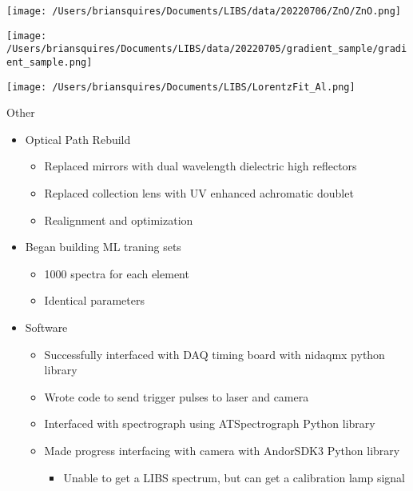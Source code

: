\documentclass{beamer}
\begin{document}
\begin{frame}
    \texttt{[image: /Users/briansquires/Documents/LIBS/data/20220706/ZnO/ZnO.png]}
\end{frame}

\begin{frame}
    \texttt{[image: /Users/briansquires/Documents/LIBS/data/20220705/gradient\_sample/gradient\_sample.png]}
\end{frame}

\begin{frame}
    \texttt{[image: /Users/briansquires/Documents/LIBS/LorentzFit\_Al.png]}
\end{frame}

\begin{frame}{Other}
    \begin{itemize}
        \item Optical Path Rebuild
        \begin{itemize}
            \item Replaced mirrors with dual wavelength dielectric high reflectors
            \item Replaced collection lens with UV enhanced achromatic doublet
            \item Realignment and optimization
        \end{itemize}
        \item Began building ML traning sets
        \begin{itemize}
            \item 1000 spectra for each element
            \item Identical parameters
        \end{itemize}
        \item Software
        \begin{itemize}
            \item Successfully interfaced with DAQ timing board with nidaqmx python library
            \item Wrote code to send trigger pulses to laser and camera
            \item Interfaced with spectrograph using ATSpectrograph Python library
            \item Made progress interfacing with camera with AndorSDK3 Python library
            \begin{itemize}
                \item Unable to get a LIBS spectrum, but can get a calibration lamp signal
            \end{itemize}
        \end{itemize}
    \end{itemize}
\end{frame}
\end{document}
